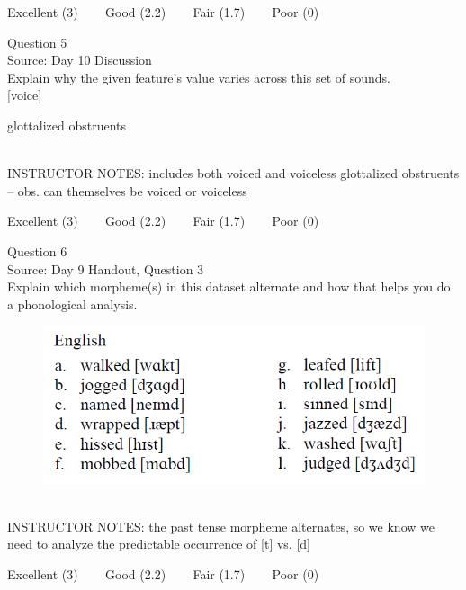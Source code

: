 \documentclass[12pt]{article}
\begin{document}
\vfill
Excellent (3) ~~~ Good (2.2) ~~~ Fair (1.7) ~~~ Poor (0)
\newpage

{\large Question 5}\\

Source: Day 10 Discussion\\

Explain why the given feature's value varies across this set of sounds.\\

{[voice]}

glottalized obstruents


~\\
INSTRUCTOR NOTES: includes both voiced and voiceless glottalized obstruents -- obs. can themselves be voiced or voiceless


\vfill
Excellent (3) ~~~ Good (2.2) ~~~ Fair (1.7) ~~~ Poor (0)
\newpage

{\large Question 6}\\

Source: Day 9 Handout, Question 3\\

Explain which morpheme(s) in this dataset alternate and how that helps you do a phonological analysis.\\

\begin{figure}[H]
\includegraphics{../images/english_past.png}
\end{figure}

~\\
INSTRUCTOR NOTES: the past tense morpheme alternates, so we know we need to analyze the predictable occurrence of [t] vs. [d]


\vfill
Excellent (3) ~~~ Good (2.2) ~~~ Fair (1.7) ~~~ Poor (0)
\newpage

\begin{center}
\textbf{{\color{red}{\HUGE END OF EXAM}}}\\

\end{center}
\newpage
\end{document}
